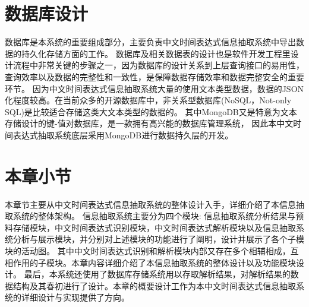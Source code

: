 \section{数据库设计}

数据库是本系统的重要组成部分，主要负责中文时间表达式信息抽取系统中导出数据的持久化存储方面的工作。
数据库及相关数据表的设计也是软件开发工程里设计流程中非常关键的步骤之一，因为数据库的设计关系到上层查询接口的易用性，查询效率以及数据的完整性和一致性，是保障数据存储效率和数据完整安全的重要环节。
因为中文时间表达式信息抽取系统大量的使用文本类型数据，数据的JSON化程度较高。在当前众多的开源数据库中，非关系型数据库(NoSQL，Not-only SQL)是比较适合存储这类大文本类型的数据的。
其中MongoDB又是特意为文本存储设计的键-值对数据库，是一款拥有高兴能的数据库管理系统，
因此本中文时间表达式抽取系统底层采用MongoDB进行数据持久层的开发。

\section{本章小节}

本章节主要从中文时间表达式信息抽取系统的整体设计入手，详细介绍了本信息抽取系统的整体架构。
信息抽取系统主要分为四个模块: 信息抽取系统分析结果与预料存储模块，中文时间表达式识别模块，中文时间表达式解析模块以及信息抽取系统分析与展示模块，并分别对上述模块的功能进行了阐明，设计并展示了各个子模块的活动图。
其中中文时间表达式识别和解析模块内部又存在多个相辅相成，互相作用的子模块。本章内容详细介绍了本信息抽取系统的整体设计以及功能模块设计。
最后，本系统还使用了数据库存储系统用以存取解析结果，对解析结果的数据结构及其春初进行了设计。本章的概要设计工作为本中文时间表达式信息抽取系统的详细设计与实现提供了方向。